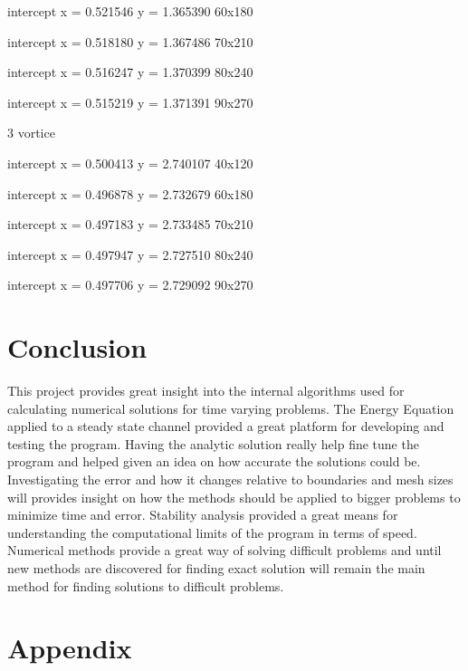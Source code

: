\documentclass[paper=a4, fontsize=11pt, abstract=on]{scrartcl}
\numberwithin{equation}{section}		%
\numberwithin{figure}{section}			%
\numberwithin{table}{section}				%
\begin{document}
intercept x = 0.521546 y = 1.365390   60x180

intercept x = 0.518180 y = 1.367486   70x210

intercept x = 0.516247 y = 1.370399   80x240

intercept x = 0.515219 y = 1.371391   90x270

3 vortice

intercept x = 0.500413 y = 2.740107  40x120

intercept x = 0.496878 y = 2.732679  60x180

intercept x = 0.497183 y = 2.733485  70x210

intercept x = 0.497947 y = 2.727510  80x240

intercept x = 0.497706 y = 2.729092  90x270











\section{Conclusion}
This project provides great insight into the internal algorithms used for calculating numerical solutions for time varying problems. The Energy Equation applied to a steady state channel provided a great platform for developing and testing the program. Having the analytic solution really help fine tune the program and helped given an idea on how accurate the solutions could be. Investigating the error and how it changes relative to boundaries and mesh sizes will provides insight on how the methods should be applied to bigger problems to minimize time and error. Stability analysis provided a great means for understanding the computational limits of the program in terms of speed. Numerical methods provide a great way of solving difficult problems and until new methods are discovered for finding exact solution will remain the main method for finding solutions to difficult problems. 





\newpage
\appendix
\section{Appendix} \label{App:Appendix}
\end{document}
